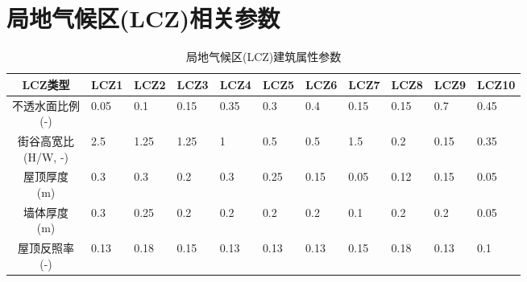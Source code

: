\chapter{局地气候区(LCZ)相关参数}\label{局地气候区(LCZ)建筑属性参数}
\begin{landscape}
  \begin{table}[htbp]
    \footnotesize
    \centering
    \caption{局地气候区(LCZ)建筑属性参数}
    \label{tab:lcz局地气候区建筑属性参数}
    \begin{tabular}{@{}cllllllllll@{}}
      \toprule
      LCZ类型                   & LCZ1                        & LCZ2                 & LCZ3                 & LCZ4                & LCZ5                & LCZ6                & LCZ7                 & LCZ8                 & LCZ9                & LCZ10                \\ \midrule
      \makecell{不透水面比例   \\ {(-)}}                      & 0.05                 & 0.1                  & 0.15                & 0.35                & 0.3                 & 0.4                  & 0.15                 & 0.15                & 0.7                   & 0.45                 \\
      \makecell{街谷高宽比     \\ (H/W, -)}                   & 2.5                  & 1.25                 & 1.25                & 1                   & 0.5                 & 0.5                  & 1.5                  & 0.2                 & 0.15                  & 0.35                 \\
      \makecell{屋顶厚度       \\ {(m)}}                      & 0.3                  & 0.3                  & 0.2                 & 0.3                 & 0.25                & 0.15                 & 0.05                 & 0.12                & 0.15                  & 0.05                 \\
      \makecell{墙体厚度       \\ {(m)}}                      & 0.3                  & 0.25                 & 0.2                 & 0.2                 & 0.2                 & 0.2                  & 0.1                  & 0.2                 & 0.2                   & 0.05                 \\
      \makecell{屋顶反照率     \\ {(-)}}                      & 0.13                 & 0.18                 & 0.15                & 0.13                & 0.13                & 0.13                 & 0.15                 & 0.18                & 0.13                  & 0.1                  \\

\end{tabular}
\end{table}
\end{landscape}
